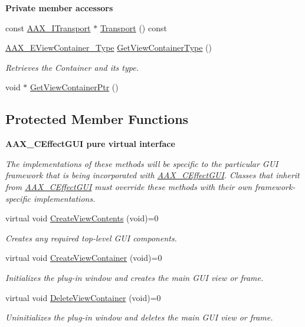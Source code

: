 \begin{Indent}{\bf Private member accessors}
\begin{DoxyCompactItemize}
const \hyperlink{a00116}{A\+A\+X\+\_\+\+I\+Transport} $\ast$ \hyperlink{a00017_ae148b3fde49d5dd9c28139b84ff3a43b}{Transport} () const 
\item 
\hyperlink{a00214_a89d5cb8c7fdb11f34e695fb0e057b764}{A\+A\+X\+\_\+\+E\+View\+Container\+\_\+\+Type} \hyperlink{a00017_a010cc00926a3d219fa4de47ac182eb9b}{Get\+View\+Container\+Type} ()
\begin{DoxyCompactList}\small\item\em Retrieves the Container and it\textquotesingle{}s type. \end{DoxyCompactList}\item 
void $\ast$ \hyperlink{a00017_a0bd9e15c41584fb9a53ff5724e5db330}{Get\+View\+Container\+Ptr} ()
\end{DoxyCompactItemize}
\end{Indent}
\subsection*{Protected Member Functions}
\begin{Indent}{\bf A\+A\+X\+\_\+\+C\+Effect\+G\+U\+I pure virtual interface}\par
{\em The implementations of these methods will be specific to the particular G\+U\+I framework that is being incorporated with \hyperlink{a00017}{A\+A\+X\+\_\+\+C\+Effect\+G\+U\+I}. Classes that inherit from \hyperlink{a00017}{A\+A\+X\+\_\+\+C\+Effect\+G\+U\+I} must override these methods with their own framework-\/specific implementations. }\begin{DoxyCompactItemize}
\item 
virtual void \hyperlink{a00017_ab84514feda09e4893ee0ff5e6df99b23}{Create\+View\+Contents} (void)=0
\begin{DoxyCompactList}\small\item\em Creates any required top-\/level G\+U\+I components. \end{DoxyCompactList}\item 
virtual void \hyperlink{a00017_adbc45d3155099452ca746ee3940f16da}{Create\+View\+Container} (void)=0
\begin{DoxyCompactList}\small\item\em Initializes the plug-\/in window and creates the main G\+U\+I view or frame. \end{DoxyCompactList}\item 
virtual void \hyperlink{a00017_a56632ebf59c5ef3f4fe3d7d76da27a37}{Delete\+View\+Container} (void)=0
\begin{DoxyCompactList}\small\item\em Uninitializes the plug-\/in window and deletes the main G\+U\+I view or frame. \end{DoxyCompactList}\end{DoxyCompactItemize}
\end{Indent}
